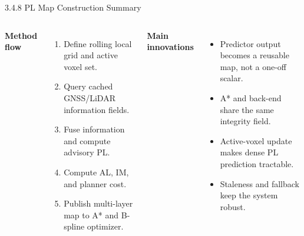 \documentclass[10pt,aspectratio=169,xcolor=dvipsnames]{beamer}
\begin{document}
\begin{frame}{3.4.8 PL Map Construction Summary}
  \small
  \begin{columns}[T]
    \textbf{Method flow}
    \begin{enumerate}\footnotesize
      \item Define rolling local grid and active voxel set.
      \item Query cached GNSS/LiDAR information fields.
      \item Fuse information and compute advisory PL.
      \item Compute AL, IM, and planner cost.
      \item Publish multi-layer map to A* and B-spline optimizer.
    \end{enumerate}

    \textbf{Main innovations}
    \begin{itemize}\footnotesize
      \item Predictor output becomes a reusable map, not a one-off scalar.
      \item A* and back-end share the same integrity field.
      \item Active-voxel update makes dense PL prediction tractable.
      \item Staleness and fallback keep the system robust.
    \end{itemize}
  \end{columns}
\end{frame}

\end{document}
